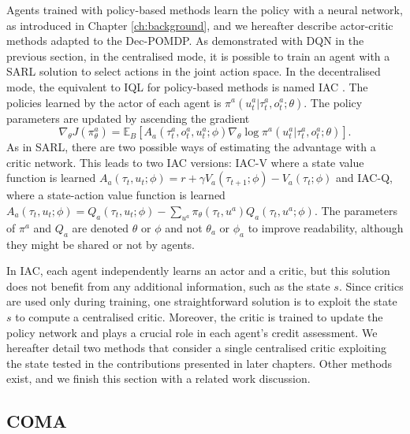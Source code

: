 Agents trained with policy-based methods learn the policy with a neural network, as introduced in Chapter \ref{ch:background}, and we hereafter describe actor-critic methods adapted to the Dec-POMDP.
As demonstrated with DQN in the previous section, in the centralised mode, it is possible to train an agent with a SARL solution to select actions in the joint action space.
In the decentralised mode, the equivalent to IQL for policy-based methods is named IAC \citep{foerster2017coma}.
The policies learned by the actor of each agent is $\pi^{a}(u_t^{a}|\tau_t^{a}, o^a_t;\theta)$.
The policy parameters are updated by ascending the gradient
\begin{equation}
\label{eq:ch3_policy_grad}
    \nabla_\theta J(\pi^a_\theta) = \mathbb{E}_B\left[A_a(\tau^{a}_t, o_t^a, u_t^{a}; \phi) \nabla_{\theta} \log \pi^{a}(u_t^{a}|\tau_t^{a},  o_t^a;\theta)\right].
\end{equation}
As in SARL, there are two possible ways of estimating the advantage with a critic network.
This leads to two IAC versions: IAC-V where a state value function is learned $A_a(\tau_t, u_t; \phi) = r + \gamma V_a(\tau_{t+1}; \phi) - V_a(\tau_t; \phi)$ and IAC-Q, where a state-action value function is learned $A_a(\tau_t, u_t; \phi) = Q_a(\tau_t, u_t; \phi) - \sum_{u^a}\pi_\theta(\tau_t, u^a)Q_a(\tau_t, u^a; \phi)$.
The parameters of $\pi^a$ and $Q_a$ are denoted $\theta$ or $\phi$ and not $\theta_a$ or $\phi_a$ to improve readability, although they might be shared or not by agents.

In IAC, each agent independently learns an actor and a critic, but this solution does not benefit from any additional information, such as the state $s$.
Since critics are used only during training, one straightforward solution is to exploit the state $s$ to compute a centralised critic.
Moreover, the critic is trained to update the policy network and plays a crucial role in each agent's credit assessment.
We hereafter detail two methods that consider a single centralised critic exploiting the state tested in the contributions presented in later chapters.
Other methods exist, and we finish this section with a related work discussion.


\subsection{COMA}
\label{sec:ch3_coma}

